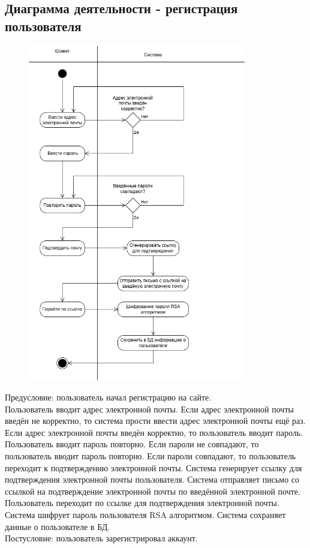 \documentclass[a4paper]{report}
\begin{document}
\subsection{Диаграмма деятельности - регистрация пользователя}
\begin{figure}[H]
    \centering
    \includegraphics[width=0.85\textwidth]{Диаграмма деятельности регистрация.png}
\end{figure}
Предусловие: пользователь начал регистрацию на сайте.\\
Пользователь вводит адрес электронной почты. Если адрес электронной почты введён не корректно, то система прости ввести адрес электронной почты ещё раз. Если адрес электронной почты введён корректно, то пользователь вводит пароль. Пользователь вводит пароль повторно. Если пароли не совпадают, то пользователь вводит пароль повторно. Если пароли совпадают, то пользователь переходит к подтверждению электронной почты. Система генерирует ссылку для подтверждения электронной почты пользователя. Система отправляет письмо со ссылкой на подтверждение электронной почты по введённой электронной почте. Пользователь переходит по ссылке для подтверждения электронной почты. Система шифрует пароль пользователя RSA алгоритмом. Система сохраняет данные о пользователе в БД.\\
Постусловие: пользователь зарегистрировал аккаунт.
\end{document}
